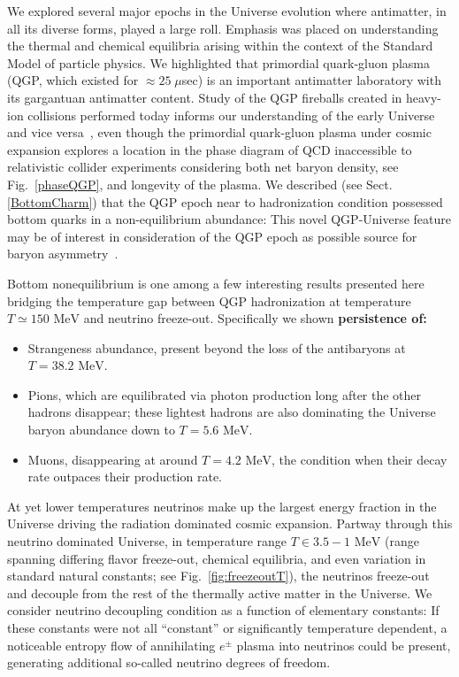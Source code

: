 \documentclass[universe,article,submit,moreauthors,pdftex,a4paper]{Definitions/mdpi}
\newcommand{\MeV}{\text{ MeV}}
\newcommand*{\rf}[1]{Fig.~{\ref{#1}}}
\newcommand*{\rsec}[1]{Sect.\,{\ref{#1}}}
\begin{document}
We explored several major epochs in the Universe evolution where antimatter, in all its diverse forms, played a large roll. Emphasis was placed on understanding the thermal and chemical equilibria arising within the context of the Standard Model of particle physics. We highlighted that primordial quark-gluon plasma (QGP, which existed for $\approx 25\;\mu$sec) is an important antimatter laboratory with its gargantuan antimatter content. Study of the QGP fireballs created in heavy-ion collisions performed today informs our understanding of the early Universe and vice versa~\cite{Borsanyi:2016ksw,Rafelski:2013qeu,Petran:2013lja,Philipsen:2012nu}, even though the primordial quark-gluon plasma under cosmic expansion explores a location in the phase diagram of QCD inaccessible to relativistic collider experiments considering both net baryon density, see \rf{phaseQGP}, and longevity of the plasma. We described (see \rsec{BottomCharm}) that the QGP epoch near to hadronization condition possessed bottom quarks in a non-equilibrium abundance: This novel QGP-Universe feature may be of interest in consideration of the QGP epoch as possible source for baryon asymmetry~\cite{Yang:2020nne,Yang:2023bot}. 

Bottom nonequilibrium is one among a few interesting results presented here bridging the temperature gap between QGP hadronization at temperature $T\simeq150\MeV$ and neutrino freeze-out. Specifically we shown {\bf persistence of:}
 \begin{itemize}
 \item Strangeness abundance, present beyond the loss of the antibaryons at $T=38.2\MeV$.
 \item Pions, which are equilibrated via photon production long after the other hadrons disappear; these lightest hadrons are also dominating the Universe baryon abundance down to $T=5.6\MeV$.
 \item Muons, disappearing at around $T=4.2\MeV$, the condition when their decay rate outpaces their production rate.
 \end{itemize}

At yet lower temperatures neutrinos make up the largest energy fraction in the Universe driving the radiation dominated cosmic expansion. Partway through this neutrino dominated Universe, in temperature  range $T\in 3.5-1\MeV$ (range spanning differing flavor freeze-out, chemical equilibria, and even variation in  standard natural constants; see \rf{fig:freezeoutT}), the neutrinos freeze-out and decouple from the rest of the thermally active matter in the Universe. We consider neutrino decoupling condition as a function of elementary constants: If these constants were not all ``constant'' or significantly temperature dependent, a noticeable entropy flow of annihilating $e^{\pm}$ plasma into neutrinos could be present, generating additional so-called neutrino degrees of freedom.
\end{document}

